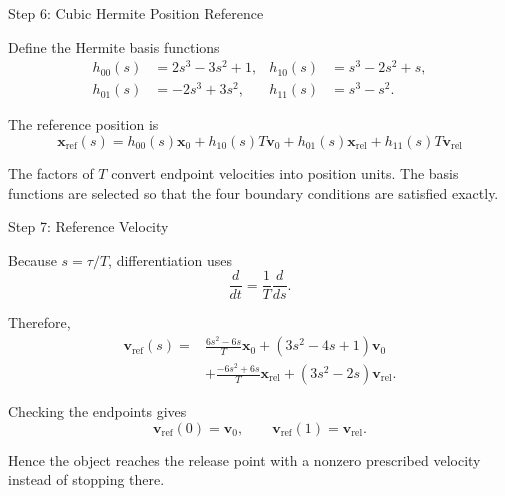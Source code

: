 \documentclass[aspectratio=169]{beamer}
\newcommand{\vect}[1]{\bm{#1}}
\begin{document}
\begin{frame}{Step 6: Cubic Hermite Position Reference}

Define the Hermite basis functions
\[
\begin{aligned}
h_{00}(s)&=2s^3-3s^2+1, &
h_{10}(s)&=s^3-2s^2+s,\\
h_{01}(s)&=-2s^3+3s^2, &
h_{11}(s)&=s^3-s^2.
\end{aligned}
\]

The reference position is
\[
\boxed{
\vect{x}_{\mathrm{ref}}(s)
=h_{00}(s)\vect{x}_0
+h_{10}(s)T\vect{v}_0
+h_{01}(s)\vect{x}_{\mathrm{rel}}
+h_{11}(s)T\vect{v}_{\mathrm{rel}}
}
\]

The factors of $T$ convert endpoint velocities into position units.
The basis functions are selected so that the four boundary conditions
are satisfied exactly.

\end{frame}

\begin{frame}{Step 7: Reference Velocity}

Because $s=\tau/T$, differentiation uses
\[
\frac{d}{dt}=\frac{1}{T}\frac{d}{ds}.
\]

Therefore,
\[
\boxed{
\begin{aligned}
\vect{v}_{\mathrm{ref}}(s)
={}&\frac{6s^2-6s}{T}\vect{x}_0
+(3s^2-4s+1)\vect{v}_0\\
&+\frac{-6s^2+6s}{T}\vect{x}_{\mathrm{rel}}
+(3s^2-2s)\vect{v}_{\mathrm{rel}}.
\end{aligned}
}
\]

Checking the endpoints gives
\[
\vect{v}_{\mathrm{ref}}(0)=\vect{v}_0,
\qquad
\vect{v}_{\mathrm{ref}}(1)=\vect{v}_{\mathrm{rel}}.
\]

Hence the object reaches the release point with a nonzero prescribed
velocity instead of stopping there.

\end{frame}
\end{document}
